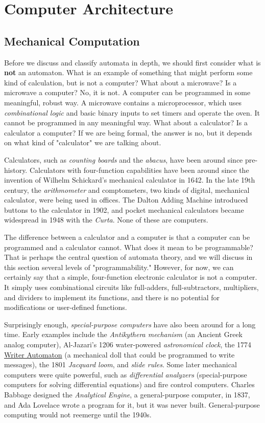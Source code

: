 \chapter{Computer Architecture}

\section{Mechanical Computation}

Before we discuss and classify automata in depth, we should first consider what is \textbf{not} an automaton. What is an example of something that might perform some kind of calculation, but is not a computer? What about a microwave? Is a microwave a computer? No, it is not. A computer can be programmed in some meaningful, robust way. A microwave contains a microprocessor, which uses \textit{combinational logic} and basic binary inputs to set timers and operate the oven. It cannot be programmed in any meaningful way. What about a calculator? Is a calculator a computer? If we are being formal, the answer is no, but it depends on what kind of "calculator" we are talking about.

Calculators, such as \textit{counting boards} and the \textit{abacus}, have been around since pre-history. Calculators with four-function capabilities have been around since the invention of Wilhelm Schickard's mechanical calculator in 1642. In the late 19th century, the \textit{arithmometer} and comptometers, two kinds of digital, mechanical calculator, were being used in offices. The Dalton Adding Machine introduced buttons to the calculator in 1902, and pocket mechanical calculators became widespread in 1948 with the \textit{Curta}. None of these are computers.

The difference between a calculator and a computer is that a computer can be programmed and a calculator cannot. What does it mean to be programmable? That is perhaps the central question of automata theory, and we will discuss in this section several levels of "programmability." However, for now, we can certainly say that a simple, four-function electronic calculator is not a computer. It simply uses combinational circuits like full-adders, full-subtractors, multipliers, and dividers to implement its functions, and there is no potential for modifications or user-defined functions.

Surprisingly enough, \textit{special-purpose computers} have also been around for a long time. Early examples include the \textit{Antikythera mechanism} (an Ancient Greek analog computer), Al-Jazari's 1206 water-powered \textit{astronomical clock}, the 1774 \underline{Writer Automaton} (a mechanical doll that could be programmed to write messages), the 1801 \textit{Jacquard loom}, and \textit{slide rules}. Some later mechanical computers were quite powerful, such as \textit{differential analyzers} (special-purpose computers for solving differential equations) and fire control computers. Charles Babbage designed the \textit{Analytical Engine}, a general-purpose computer, in 1837, and Ada Lovelace wrote a program for it, but it was never built. General-purpose computing would not reemerge until the 1940s.

